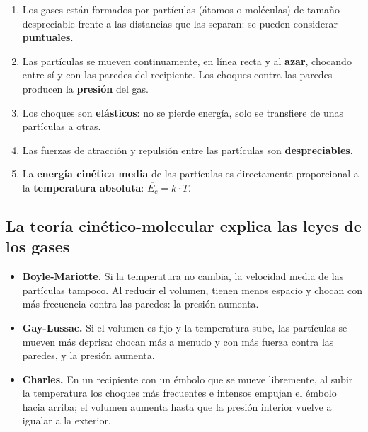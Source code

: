 \begin{definition}
    \leavevmode %
    \begin{enumerate}[label=\numberballblue]
        \item Los gases están formados por partículas (átomos o moléculas) de tamaño despreciable frente a las distancias que
        las separan: se pueden considerar \textbf{puntuales}.
        \item Las partículas se mueven continuamente, en línea recta y al \textbf{azar}, chocando entre sí y con las paredes del
        recipiente. Los choques contra las paredes producen la \textbf{presión} del gas.
        \item Los choques son \textbf{elásticos}: no se pierde energía, solo se transfiere de unas partículas a otras.
        \item Las fuerzas de atracción y repulsión entre las partículas son \textbf{despreciables}.
        \item La \textbf{energía cinética media} de las partículas es directamente proporcional a la \textbf{temperatura
        absoluta}: \(\overline{E_c} = k \cdot T\).
    \end{enumerate}
\end{definition}

\subsection{La teoría cinético-molecular explica las leyes de los gases}

\begin{itemize}
    \item \textbf{Boyle-Mariotte.} Si la temperatura no cambia, la velocidad media de las partículas tampoco. Al reducir el
    volumen, tienen menos espacio y chocan con más frecuencia contra las paredes: la presión aumenta.
    \item \textbf{Gay-Lussac.} Si el volumen es fijo y la temperatura sube, las partículas se mueven más deprisa: chocan más a
    menudo y con más fuerza contra las paredes, y la presión aumenta.
    \item \textbf{Charles.} En un recipiente con un émbolo que se mueve libremente, al subir la temperatura los choques más
    frecuentes e intensos empujan el émbolo hacia arriba; el volumen aumenta hasta que la presión interior vuelve a igualar a
    la exterior.
\end{itemize}

